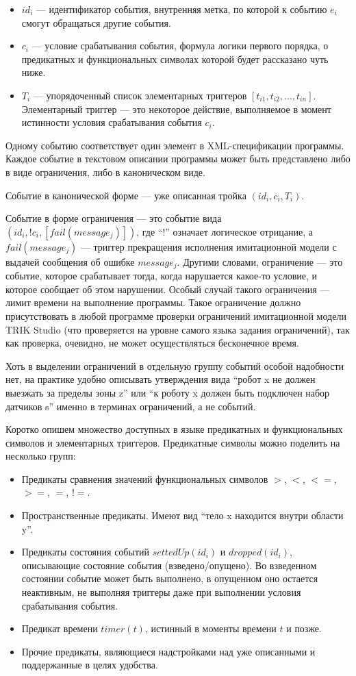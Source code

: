 \documentclass[conference]{IEEEtran}
\begin{document}
\begin{itemize}
	\item $id_i$ --- идентификатор события, внутренняя метка, по которой к событию $e_i$ смогут обращаться другие события.
	\item $c_i$ --- условие срабатывания события, формула логики первого порядка, о предикатных и функциональных символах которой будет рассказано чуть ниже.
	\item $T_i$ --- упорядоченный список элементарных триггеров $[ t_{i1}, t_{i2}, ..., t_{in} ]$. Элементарный триггер --- это некоторое 
			действие, выполняемое в момент истинности условия срабатывания события $c_i$.
\end{itemize}

Одному событию соответствует один элемент в XML-спецификации программы. Каждое событие в текстовом описании 
программы может быть представлено либо в виде ограничения, либо в каноническом виде.

Событие в канонической форме --- уже описанная тройка $(id_i, c_i, T_i)$.

Событие в форме ограничения --- это событие вида $(id_i, !c_i, [ fail(message_j) ])$, где "`!"' означает 
логическое отрицание, а $fail(message_j)$ --- триггер прекращения исполнения имитационной модели с выдачей 
сообщения об ошибке $message_j$. Другими словами, ограничение --- это событие, которое срабатывает тогда, 
когда нарушается какое-то условие, и которое сообщает об этом нарушении. Особый случай такого ограничения --- 
лимит времени на выполнение программы. Такое ограничение должно присутствовать в любой программе проверки 
ограничений имитационной модели TRIK Studio (что проверяется на уровне самого языка задания ограничений), 
так как проверка, очевидно, не может осуществляться бесконечное время. 

Хоть в выделении ограничений в отдельную группу событий особой надобности нет, на практике удобно описывать 
утверждения вида "`робот x не должен выезжать за пределы зоны z"' или "`к роботу x должен быть подключен набор датчиков s"' 
именно в терминах ограничений, а не событий.

Коротко опишем множество доступных в языке предикатных и функциональных символов и элементарных триггеров. 
Предикатные символы можно поделить на несколько групп:
\begin{itemize}
	\item Предикаты сравнения значений функциональных символов $>$, $<$, $<=$, $>=$, $=$, $!=$.
	\item Пространственные предикаты. Имеют вид "`тело x находится внутри области y"'.
	\item Предикаты состояния событий $settedUp(id_i)$ и $dropped(id_i)$, описывающие состояние события 
			(взведено/опущено). Во взведенном состоянии событие может быть выполнено, в опущенном оно 
			остается неактивным, не выполняя триггеры даже при выполнении условия срабатывания события.
	\item Предикат времени $timer(t)$, истинный в моменты времени $t$ и позже.
	\item Прочие предикаты, являющиеся надстройками над уже описанными и поддержанные в целях удобства.
\end{itemize}
\end{document}
